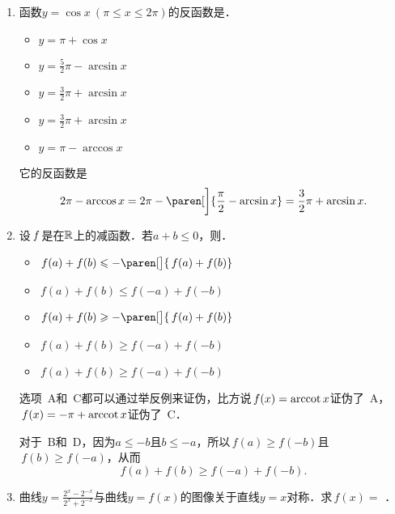\begin{enumerate}
\item 函数\(y = \cos x\ (\pi \le x \le 2\pi)\)的反函数是\uline{\makebox[6em]{}}．
  \begin{itemize}
    \renewcommand{\labelitemi}{\faCircleThin}
  \item \(y = \pi + \cos x\)
  \item \(y = \frac52\pi - \arcsin x\)
    \ifshowsol
    \item[\faCircle] \(y = \frac32\pi + \arcsin x\)
    \else
    \item \(y = \frac32\pi + \arcsin x\)
    \fi
  \item \(y = \pi - \arccos x\)
  \end{itemize}

  \ifshowsol
    它的反函数是
    \begin{equation*}
      2\pi - \arccos x
      = 2\pi - \paren[\bigg]{\frac\pi2 - \arcsin x}
      = \frac32\pi + \arcsin x.
    \end{equation*}
  \fi

\item 设\(\,f\mkern2mu\)是在\(\mathbb{R}\)上的减函数．若\(a + b \le 0\)，则\uline{\makebox[6em]{}}．
  \begin{itemize}
    \renewcommand{\labelitemi}{\faCircleThin}
  \item \(\,f(a) + f(b) \le -\paren[\big]{\,f(a) + f(b)}\)
  \item \(\,f(a) + f(b) \le f(-a) + f(-b)\)
  \item \(\,f(a) + f(b) \ge -\paren[\big]{\,f(a) + f(b)}\)
    \ifshowsol
    \item[\faCircle] \(\,f(a) + f(b) \ge f(-a) + f(-b)\)
    \else
    \item \(\,f(a) + f(b) \ge f(-a) + f(-b)\)
    \fi
  \end{itemize}

  \ifshowsol
    选项~A和~C都可以通过举反例来证伪，比方说\(\,f(x) = \operatorname{arccot} x\)证伪了~A，\(\,f(x) = -\pi + \operatorname{arccot} x\)证伪了~C．

    对于~B和~D，因为\(a \le -b\)且\(b \le -a\)，所以\(\,f(a) \ge f(-b)\)且\(\,f(b) \ge f(-a)\)，从而
    \begin{equation*}
      f(a) + f(b) \ge f(-a) + f(-b).
    \end{equation*}
  \fi

\item 曲线\(y = \frac{2^x-2^{-x}}{2^x+2^{-x}}\)与曲线\(y = f(x)\)的图像关于直线\(y = x\)对称．求\(\,f(x) =\)
  \ifshowsol
    {\setlength{\ULdepth}{1.15ex}%
      \uline{}}．


\end{enumerate}
